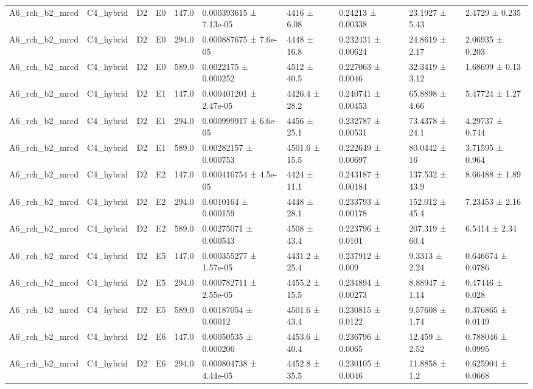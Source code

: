 \begin{table}
\begin{tabular}{llllllllll}
A6\_rch\_b2\_mrcd & C4\_hybrid & D2 & E0 & 147.0 & 0.000393615 ± 7.13e-05 & 4416 ± 6.08 & 0.24213 ± 0.00338 & 23.1927 ± 5.43 & 2.4729 ± 0.235 \\
A6\_rch\_b2\_mrcd & C4\_hybrid & D2 & E0 & 294.0 & 0.000887675 ± 7.6e-05 & 4448 ± 16.8 & 0.232431 ± 0.00624 & 24.8619 ± 2.17 & 2.06935 ± 0.203 \\
A6\_rch\_b2\_mrcd & C4\_hybrid & D2 & E0 & 589.0 & 0.0022175 ± 0.000252 & 4512 ± 40.5 & 0.227063 ± 0.0046 & 32.3419 ± 3.12 & 1.68699 ± 0.13 \\
A6\_rch\_b2\_mrcd & C4\_hybrid & D2 & E1 & 147.0 & 0.000401201 ± 2.47e-05 & 4426.4 ± 28.2 & 0.240741 ± 0.00453 & 65.8898 ± 4.66 & 5.47724 ± 1.27 \\
A6\_rch\_b2\_mrcd & C4\_hybrid & D2 & E1 & 294.0 & 0.000999917 ± 6.6e-05 & 4456 ± 25.1 & 0.232787 ± 0.00531 & 73.4378 ± 24.1 & 4.29737 ± 0.744 \\
A6\_rch\_b2\_mrcd & C4\_hybrid & D2 & E1 & 589.0 & 0.00282157 ± 0.000753 & 4501.6 ± 15.5 & 0.222649 ± 0.00697 & 80.0442 ± 16 & 3.71595 ± 0.964 \\
A6\_rch\_b2\_mrcd & C4\_hybrid & D2 & E2 & 147.0 & 0.000416754 ± 4.5e-05 & 4424 ± 11.1 & 0.243187 ± 0.00184 & 137.532 ± 43.9 & 8.66488 ± 1.89 \\
A6\_rch\_b2\_mrcd & C4\_hybrid & D2 & E2 & 294.0 & 0.0010164 ± 0.000159 & 4448 ± 28.1 & 0.233793 ± 0.00178 & 152.012 ± 45.4 & 7.23453 ± 2.16 \\
A6\_rch\_b2\_mrcd & C4\_hybrid & D2 & E2 & 589.0 & 0.00275071 ± 0.000543 & 4508 ± 43.4 & 0.223796 ± 0.0101 & 207.319 ± 60.4 & 6.5414 ± 2.34 \\
A6\_rch\_b2\_mrcd & C4\_hybrid & D2 & E5 & 147.0 & 0.000355277 ± 1.57e-05 & 4431.2 ± 25.4 & 0.237912 ± 0.009 & 9.3313 ± 2.24 & 0.646674 ± 0.0786 \\
A6\_rch\_b2\_mrcd & C4\_hybrid & D2 & E5 & 294.0 & 0.000782711 ± 2.55e-05 & 4455.2 ± 15.5 & 0.234894 ± 0.00273 & 8.88947 ± 1.14 & 0.47446 ± 0.028 \\
A6\_rch\_b2\_mrcd & C4\_hybrid & D2 & E5 & 589.0 & 0.00187054 ± 0.00012 & 4501.6 ± 43.4 & 0.230815 ± 0.0122 & 9.57608 ± 1.74 & 0.376865 ± 0.0149 \\
A6\_rch\_b2\_mrcd & C4\_hybrid & D2 & E6 & 147.0 & 0.00050535 ± 0.000206 & 4453.6 ± 40.4 & 0.236796 ± 0.0065 & 12.459 ± 2.52 & 0.788046 ± 0.0995 \\
A6\_rch\_b2\_mrcd & C4\_hybrid & D2 & E6 & 294.0 & 0.000804738 ± 4.44e-05 & 4452.8 ± 35.5 & 0.230105 ± 0.0046 & 11.8858 ± 1.2 & 0.625904 ± 0.0668 \\

\end{tabular}
\end{table}
